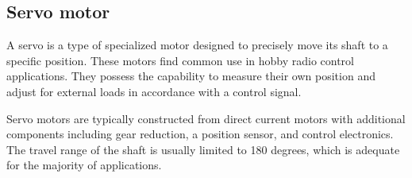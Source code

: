 \subsection{Servo motor}
A servo is a type of specialized motor designed to precisely move its shaft to a specific position. These motors find common use in hobby radio control applications. 
They possess the capability to measure their own position and adjust for external loads in accordance with a control signal.

Servo motors are typically constructed from direct current motors with additional components including gear reduction, a position sensor, and control electronics. 
The travel range of the shaft is usually limited to 180 degrees, which is adequate for the majority of applications.